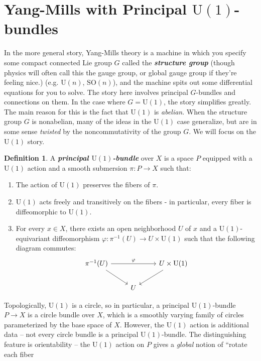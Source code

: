 \documentclass[psamsfonts, 12pt]{amsart}
\theoremstyle{definition}
\newtheorem{defn}[thm]{Definition}
\theoremstyle{remark}
\newcommand{\ib}[1]{\textbf{\textit{#1}}}
\newcommand{\inv}{^{-1}}
\begin{document}
\section{Yang-Mills with Principal $\mathrm{U}(1)$-bundles}
%
In the more general story, Yang-Mills theory is a machine in which you specify
some compact connected Lie group $G$ called the \ib{structure group} (though
physics will often call this the gauge group, or global gauge group if they're feeling
nice.) (e.g. $\mathrm{U}(n)$, $\mathrm{SO}(n)$), and the machine spits out some
differential equations for you to solve. The story here involves principal $G$-bundles
and connections on them. In the case where  $G = \mathrm{U}(1)$, the story simplifies
greatly. The main reason for this is  the fact that $\mathrm{U}(1)$ is \emph{abelian}.
When the structure group $G$ is nonabelian, many of the ideas in the $\mathrm{U}(1)$
case generalize, but are in some sense \emph{twisted} by the noncommutativity of
the group $G$. We will focus on the $\mathrm{U}(1)$ story.
%
\begin{defn}
A \ib{principal $\mathrm{U}(1)$-bundle} over $X$ is a space $P$ equipped with a
$\mathrm{U}(1)$ action and a smooth submersion $\pi : P \to X$ such that:
\begin{enumerate}
  \item The action of $\mathrm{U}(1)$ preserves the fibers of $\pi$.
  \item $\mathrm{U}(1)$ acts freely and transitively on the fibers -
  in particular, every fiber is diffeomorphic to $\mathrm{U}(1)$.
  \item For every $x \in X$, there exists an open neighborhood $U$ of $x$
  and a $\mathrm{U}(1)$-equivariant diffeomorphism
  $\varphi : \pi\inv(U) \to U \times \mathrm{U}(1)$ such that the following diagram
  commutes:
  \[\begin{tikzcd}
  \pi\inv(U) \ar[rr, "\varphi"] \ar[dr] && U \times \mathrm{U}(1) \ar[dl] \\
  & U
  \end{tikzcd}\]
\end{enumerate}
\end{defn}
%
Topologically, $\mathrm{U}(1)$ is a circle, so in particular, a principal
$\mathrm{U}(1)$-bundle $P \to X$ is a circle bundle over $X$, which is a smoothly
varying family of circles parameterized by the base space of $X$. However, the
$\mathrm{U}(1)$ action is additional data -- not every circle bundle is a principal
$\mathrm{U}(1)$-bundle. The distinguishing feature is orientability -- the
$\mathrm{U}(1)$ action on $P$ gives a \emph{global} notion of ``rotate each fiber
\end{document}
